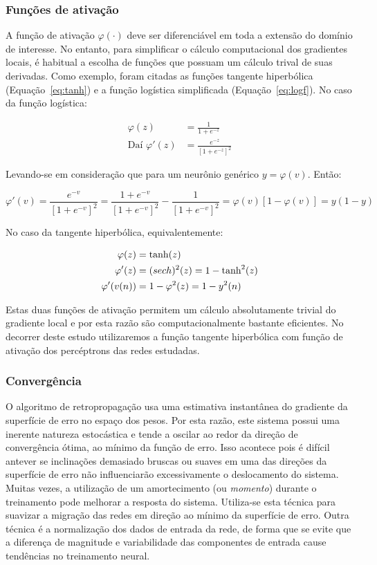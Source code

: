 \subsubsection{Funções de ativação} 

A função de ativação $\varphi(\cdot)$ deve ser diferenciável em toda a
extensão do domínio de interesse. No entanto, para simplificar o cálculo
computacional dos gradientes locais, é habitual a escolha de funções que
possuam um cálculo trival de suas derivadas. Como exemplo, foram citadas as
funções tangente hiperbólica (Equação~\ref{eq:tanh}) e a função logística
simplificada (Equação~\ref{eq:logf}). No caso da função logística:

\begin{align}
\varphi(z) &= \frac{1}{1 + e^{-z}} \\
\text{Daí } \varphi'(z) &= \frac{e^{-z}}{[1+e^{-z}]^2}
\end{align}

Levando-se em consideração que para um neurônio genérico $y =
\varphi(v)$. Então:

\begin{equation}
\varphi'(v) = \frac{e^{-v}}{[1+e^{-v}]^2} = \frac{1+e^{-v}}{[1+e^{-v}]^2} -
\frac{1}{[1+e^{-v}]^2} = \varphi(v)[1 - \varphi(v)] = y(1-y)
\end{equation}

No caso da tangente hiperbólica, equivalentemente:

\begin{align}
\varphi(z) &= \tanh(z) \\
\varphi'(z) &= \text(sech)^2(z) = 1 - \tanh^2(z) \\
\varphi'(v(n)) &= 1 - \varphi^2(z) = 1-y^2(n)
\end{align}

Estas duas funções de ativação permitem um cálculo absolutamente trivial do
gradiente local e por esta razão são computacionalmente bastante
eficientes. No decorrer deste estudo utilizaremos a função tangente
hiperbólica com função de ativação dos percéptrons das redes estudadas.

\subsubsection{Convergência}

O algoritmo de retropropagação usa uma estimativa instantânea do gradiente da
superfície de erro no espaço dos pesos. Por esta razão, este sistema possui
uma inerente natureza estocástica e tende a oscilar ao redor da direção de
convergência ótima, ao mínimo da função de erro. Isso acontece pois é difícil
antever se inclinações demasiado bruscas ou suaves em uma das direções da
superfície de erro não influenciarão excessivamente o deslocamento do
sistema. Muitas vezes, a utilização de um amortecimento (ou \emph{momento})
durante o treinamento pode melhorar a resposta do sistema. Utiliza-se esta
técnica para suavizar a migração das redes em direção ao mínimo da superfície
de erro. Outra técnica é a normalização dos dados de entrada da rede, de forma
que se evite que a diferença de magnitude e variabilidade das componentes de
entrada cause tendências no treinamento neural.

